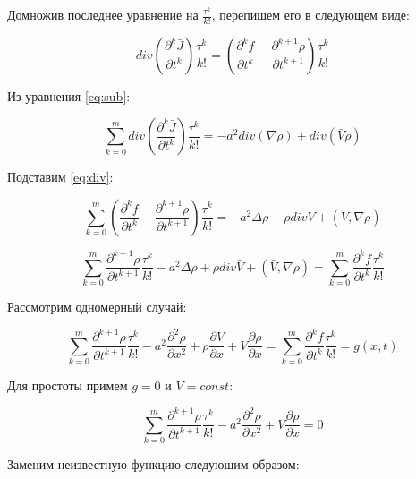 Домножив последнее уравнение на $\frac{\tau^k}{k!}$, перепишем его в следующем виде:

\begin{equation}\label{eq:div}
div \left( \dfrac{\partial^k \bar{J}}{\partial t^k} \right) \dfrac{\tau^k}{k!} = \left(\dfrac{\partial^k f}{\partial t^k} - \dfrac{\partial^{k+1} \rho}{\partial t^{k+1}} \right) \dfrac{\tau^k}{k!}
\end{equation}

Из уравнения \ref{eq:sub}:

\begin{equation*}
\sum\limits_{k=0}^{m} div \left(\dfrac{\partial^k \bar{J}}{\partial t^k} \right) \dfrac{\tau^k}{k!} = -a^2 div(\nabla \rho) + div(\bar{V} \rho)
\end{equation*}

Подставим \ref{eq:div}:

\begin{equation*}
\sum\limits_{k=0}^{m} \left(\dfrac{\partial^k f}{\partial t^k} - \dfrac{\partial^{k+1} \rho}{\partial t^{k+1}} \right) \dfrac{\tau^k}{k!} = - a^2 \Delta \rho + \rho div\bar{V} + (\bar{V},\nabla \rho)
\end{equation*}

\begin{equation*}
\sum\limits_{k=0}^{m} \dfrac{\partial^{k+1} \rho}{\partial t^{k+1}} \dfrac{\tau^k}{k!} - a^2 \Delta \rho + \rho div\bar{V} + (\bar{V},\nabla \rho) = \sum\limits_{k=0}^{m} \dfrac{\partial^k f}{\partial t^k} \dfrac{\tau^k}{k!}
\end{equation*}

Рассмотрим одномерный случай:

\begin{equation*}
\sum\limits_{k=0}^{m} \dfrac{\partial^{k+1} \rho}{\partial t^{k+1}} \dfrac{\tau^k}{k!} - a^2 \dfrac{\partial^2 \rho}{\partial x^2} + \rho \dfrac{\partial V}{\partial x} + V \dfrac{\partial \rho}{\partial x} = \sum\limits_{k=0}^{m} \dfrac{\partial^k f}{\partial t^k} \dfrac{\tau^k}{k!} = g(x,t)
\end{equation*}

Для простоты примем $g=0$ и $V=const$:

\begin{equation}
\sum\limits_{k=0}^{m} \dfrac{\partial^{k+1} \rho}{\partial t^{k+1}} \dfrac{\tau^k}{k!} - a^2 \dfrac{\partial^2 \rho}{\partial x^2} + V \dfrac{\partial \rho}{\partial x} = 0
\end{equation}

Заменим неизвестную функцию следующим образом:


